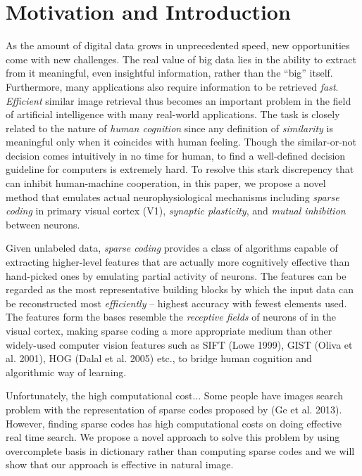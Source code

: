 \documentclass[letterpaper]{article}
\begin{document}
\section{Motivation and Introduction}
As the amount of digital data grows in unprecedented speed, new opportunities come with new challenges. The real value of big data lies in the ability to extract from it meaningful, even insightful information, rather than the ``big'' itself. Furthermore, many applications also require information to be retrieved \emph{fast}.
\emph{Efficient} similar image retrieval thus becomes an important problem in the field of artificial intelligence with many real-world applications. 
The task is closely related to the nature of \emph{human cognition} since any definition of \emph{similarity} is meaningful only when it coincides with human feeling. Though the similar-or-not decision comes intuitively in no time for human, to find a well-defined decision guideline for computers is extremely hard. To resolve this stark discrepency that can inhibit human-machine cooperation, in this paper, we propose a novel method that emulates actual neurophysiological mechanisms including \emph{sparse coding} in primary visual cortex (V1), \emph{synaptic plasticity}, and \emph{mutual inhibition} between neurons. 

Given unlabeled data, \emph{sparse coding} provides a class of algorithms capable of extracting higher-level features that are actually more cognitively effective than hand-picked ones by emulating partial activity of neurons. The features can be regarded as the most representative building blocks by which the input data can be reconstructed most \emph{efficiently} -- highest accuracy with fewest elements used. The features form the bases resemble the \emph{receptive fields} of neurons of in the visual cortex, making sparse coding a more appropriate medium than other widely-used computer vision features such as SIFT (Lowe 1999), GIST (Oliva et al. 2001), HOG (Dalal et al. 2005) etc., to bridge human cognition and algorithmic way of learning.

Unfortunately, the high computational cost...
Some people have images search problem with the representation of sparse codes proposed by (Ge et al. 2013). However, finding sparse codes has high computational costs on doing effective real time search. We propose a novel approach to solve this problem by using overcomplete basis in dictionary rather than computing sparse codes and we will show that our approach is effective in natural image. 
\end{document}

